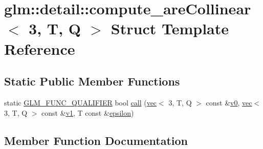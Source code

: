 \hypertarget{structglm_1_1detail_1_1compute__are_collinear_3_013_00_01_t_00_01_q_01_4}{}\section{glm\+:\+:detail\+:\+:compute\+\_\+are\+Collinear$<$ 3, T, Q $>$ Struct Template Reference}
\label{structglm_1_1detail_1_1compute__are_collinear_3_013_00_01_t_00_01_q_01_4}
\subsection*{Static Public Member Functions}
\begin{DoxyCompactItemize}
\item 
static \mbox{\hyperlink{setup_8hpp_a33fdea6f91c5f834105f7415e2a64407}{G\+L\+M\+\_\+\+F\+U\+N\+C\+\_\+\+Q\+U\+A\+L\+I\+F\+I\+ER}} bool \mbox{\hyperlink{structglm_1_1detail_1_1compute__are_collinear_3_013_00_01_t_00_01_q_01_4_ad89215d790bc1b3d246a597e261c32f4}{call}} (\mbox{\hyperlink{structglm_1_1vec}{vec}}$<$ 3, T, Q $>$ const \&\mbox{\hyperlink{_s_d_l__opengl__glext_8h_a7062a23d1d434121d4a88f530703d06a}{v0}}, \mbox{\hyperlink{structglm_1_1vec}{vec}}$<$ 3, T, Q $>$ const \&\mbox{\hyperlink{_s_d_l__opengl__glext_8h_a435c176a02c061b43e19bdf7c86cceae}{v1}}, T const \&\mbox{\hyperlink{group__gtc__constants_ga2a1e57fc5592b69cfae84174cbfc9429}{epsilon}})
\end{DoxyCompactItemize}


\subsection{Member Function Documentation}
\mbox{\label{structglm_1_1detail_1_1compute__are_collinear_3_013_00_01_t_00_01_q_01_4_ad89215d790bc1b3d246a597e261c32f4}} 
